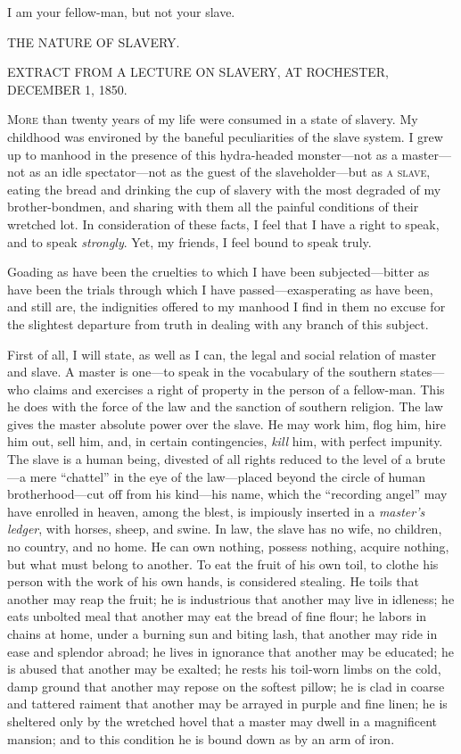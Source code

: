 I am your fellow-man, but not your slave.

{\protect\hypertarget{ux5cux7bux5cux7bux5cux7b1ux5cux7dux5cux7dux5cux7d}{}{}}

{}

{THE NATURE OF SLAVERY.}

{EXTRACT FROM A LECTURE ON SLAVERY, AT ROCHESTER, DECEMBER 1, 1850.}

\textsc{More} than twenty years of my life were consumed in a state of
slavery. My childhood was environed by the baneful peculiarities of the
slave system. I grew up to manhood in the presence of this hydra-headed
monster---not as a master---not as an idle spectator---not as the guest
of the slaveholder---but as \textsc{a slave}, eating the bread and
drinking the cup of slavery with the most degraded of my
brother-bondmen, and sharing with them all the painful conditions of
their wretched lot. In consideration of these facts, I feel that I have
a right to speak, and to speak \emph{strongly}. Yet, my friends, I feel
bound to speak truly.

Goading as have been the cruelties to which I have been
subjected---bitter as have been the trials through which I have
passed---exasperating as have been, and still are, the indignities
offered to my manhood I find in them no excuse for the slightest
departure from truth in dealing with any branch of this subject.

First of all, I will state, as well as I can, the legal and social
relation of master and slave. A master is one---to speak in the
vocabulary of the southern states---who claims and exercises a right of
property in the person of a fellow-man. This he does with the force of
the law and the sanction of southern religion. The law gives the master
absolute power over the slave. He may work him, flog him, hire him out,
sell him, and, in certain contingencies, \emph{kill} him, with perfect
impunity. The slave is a human being, divested of all rights reduced to
the level of a brute---a mere ``chattel'' in the eye of the law---placed
beyond the circle of human brotherhood---cut off from his kind---his
name, which the ``recording angel'' may have enrolled in heaven, among
the blest, is impiously inserted in a \emph{master's ledger}, with
horses, sheep, and swine. In law, the slave has no wife, no children, no
country, and no home. He {}can own nothing, possess nothing, acquire
nothing, but what must belong to another. To eat the fruit of his own
toil, to clothe his person with the work of his own hands, is considered
stealing. He toils that another may reap the fruit; he is industrious
that another may live in idleness; he eats unbolted meal that another
may eat the bread of fine flour; he labors in chains at home, under a
burning sun and biting lash, that another may ride in ease and splendor
abroad; he lives in ignorance that another may be educated; he is abused
that another may be exalted; he rests his toil-worn limbs on the cold,
damp ground that another may repose on the softest pillow; he is clad in
coarse and tattered raiment that another may be arrayed in purple and
fine linen; he is sheltered only by the wretched hovel that a master may
dwell in a magnificent mansion; and to this condition he is bound down
as by an arm of iron.

